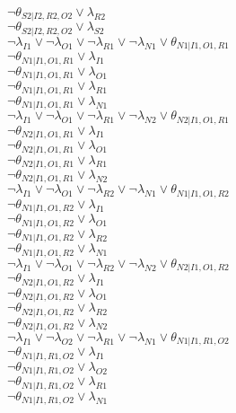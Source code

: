 $\neg\theta_{S2|I2,R2,O2} \vee \lambda_{R2}$\\
$\neg\theta_{S2|I2,R2,O2} \vee \lambda_{S2}$\\
$\neg\lambda_{I1} \vee \neg\lambda_{O1} \vee \neg\lambda_{R1} \vee \neg\lambda_{N1} \vee \theta_{N1|I1,O1,R1}$\\
$\neg\theta_{N1|I1,O1,R1} \vee \lambda_{I1}$\\
$\neg\theta_{N1|I1,O1,R1} \vee \lambda_{O1}$\\
$\neg\theta_{N1|I1,O1,R1} \vee \lambda_{R1}$\\
$\neg\theta_{N1|I1,O1,R1} \vee \lambda_{N1}$\\
$\neg\lambda_{I1} \vee \neg\lambda_{O1} \vee \neg\lambda_{R1} \vee \neg\lambda_{N2} \vee \theta_{N2|I1,O1,R1}$\\
$\neg\theta_{N2|I1,O1,R1} \vee \lambda_{I1}$\\
$\neg\theta_{N2|I1,O1,R1} \vee \lambda_{O1}$\\
$\neg\theta_{N2|I1,O1,R1} \vee \lambda_{R1}$\\
$\neg\theta_{N2|I1,O1,R1} \vee \lambda_{N2}$\\
$\neg\lambda_{I1} \vee \neg\lambda_{O1} \vee \neg\lambda_{R2} \vee \neg\lambda_{N1} \vee \theta_{N1|I1,O1,R2}$\\
$\neg\theta_{N1|I1,O1,R2} \vee \lambda_{I1}$\\
$\neg\theta_{N1|I1,O1,R2} \vee \lambda_{O1}$\\
$\neg\theta_{N1|I1,O1,R2} \vee \lambda_{R2}$\\
$\neg\theta_{N1|I1,O1,R2} \vee \lambda_{N1}$\\
$\neg\lambda_{I1} \vee \neg\lambda_{O1} \vee \neg\lambda_{R2} \vee \neg\lambda_{N2} \vee \theta_{N2|I1,O1,R2}$\\
$\neg\theta_{N2|I1,O1,R2} \vee \lambda_{I1}$\\
$\neg\theta_{N2|I1,O1,R2} \vee \lambda_{O1}$\\
$\neg\theta_{N2|I1,O1,R2} \vee \lambda_{R2}$\\
$\neg\theta_{N2|I1,O1,R2} \vee \lambda_{N2}$\\
$\neg\lambda_{I1} \vee \neg\lambda_{O2} \vee \neg\lambda_{R1} \vee \neg\lambda_{N1} \vee \theta_{N1|I1,R1,O2}$\\
$\neg\theta_{N1|I1,R1,O2} \vee \lambda_{I1}$\\
$\neg\theta_{N1|I1,R1,O2} \vee \lambda_{O2}$\\
$\neg\theta_{N1|I1,R1,O2} \vee \lambda_{R1}$\\
$\neg\theta_{N1|I1,R1,O2} \vee \lambda_{N1}$\\
